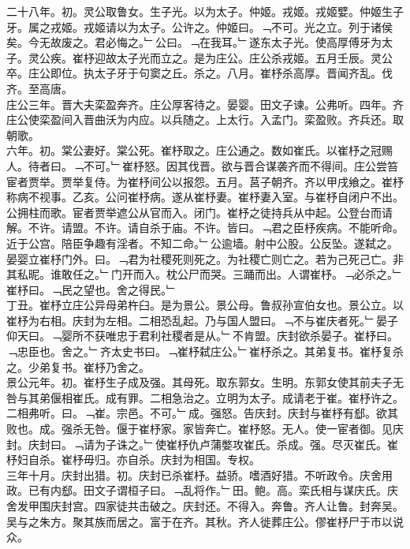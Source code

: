 \documentclass{zhvt-classic}
\begin{document}
\hspace*{2em}二十八年。初。灵公取鲁女。生子光。以为太子。仲姬。戎姬。戎姬嬖。仲姬生子牙。属之戎姬。戎姬请以为太子。公许之。仲姬曰。﹁不可。光之立。列于诸侯矣。今无故废之。君必悔之。﹂公曰。﹁在我耳。﹂遂东太子光。使高厚傅牙为太子。灵公疾。崔杼迎故太子光而立之。是为庄公。庄公杀戎姬。五月壬辰。灵公卒。庄公即位。执太子牙于句窦之丘。杀之。八月。崔杼杀高厚。晋闻齐乱。伐齐。至高唐。\\
\hspace*{2em}庄公三年。晋大夫栾盈奔齐。庄公厚客待之。晏婴。田文子谏。公弗听。四年。齐庄公使栾盈间入晋曲沃为内应。以兵随之。上太行。入孟门。栾盈败。齐兵还。取朝歌。\\
\hspace*{2em}六年。初。棠公妻好。棠公死。崔杼取之。庄公通之。数如崔氏。以崔杼之冠赐人。待者曰。﹁不可。﹂崔杼怒。因其伐晋。欲与晋合谋袭齐而不得间。庄公尝笞宦者贾举。贾举复侍。为崔杼间公以报怨。五月。莒子朝齐。齐以甲戌飨之。崔杼称病不视事。乙亥。公问崔杼病。遂从崔杼妻。崔杼妻入室。与崔杼自闭户不出。公拥柱而歌。宦者贾举遮公从官而入。闭门。崔杼之徒持兵从中起。公登台而请解。不许。请盟。不许。请自杀于庙。不许。皆曰。﹁君之臣杼疾病。不能听命。近于公宫。陪臣争趣有淫者。不知二命。﹂公逾墙。射中公股。公反坠。遂弑之。晏婴立崔杼门外。曰。﹁君为社稷死则死之。为社稷亡则亡之。若为己死己亡。非其私昵。谁敢任之。﹂门开而入。枕公尸而哭。三踊而出。人谓崔杼。﹁必杀之。﹂崔杼曰。﹁民之望也。舍之得民。﹂\\
\hspace*{2em}丁丑。崔杼立庄公异母弟杵臼。是为景公。景公母。鲁叔孙宣伯女也。景公立。以崔杼为右相。庆封为左相。二相恐乱起。乃与国人盟曰。﹁不与崔庆者死。﹂晏子仰天曰。﹁婴所不获唯忠于君利社稷者是从。﹂不肯盟。庆封欲杀晏子。崔杼曰。﹁忠臣也。舍之。﹂齐太史书曰。﹁崔杼弑庄公。﹂崔杼杀之。其弟复书。崔杼复杀之。少弟复书。崔杼乃舍之。\\
\hspace*{2em}景公元年。初。崔杼生子成及强。其母死。取东郭女。生明。东郭女使其前夫子无咎与其弟偃相崔氏。成有罪。二相急治之。立明为太子。成请老于崔。崔杼许之。二相弗听。曰。﹁崔。宗邑。不可。﹂成。强怒。告庆封。庆封与崔杼有郄。欲其败也。成。强杀无咎。偃于崔杼家。家皆奔亡。崔杼怒。无人。使一宦者御。见庆封。庆封曰。﹁请为子诛之。﹂使崔杼仇卢蒲嫳攻崔氏。杀成。强。尽灭崔氏。崔杼妇自杀。崔杼毋归。亦自杀。庆封为相国。专权。\\
\hspace*{2em}三年十月。庆封出猎。初。庆封已杀崔杼。益骄。嗜酒好猎。不听政令。庆舍用政。已有内郄。田文子谓桓子曰。﹁乱将作。﹂田。鲍。高。栾氏相与谋庆氏。庆舍发甲围庆封宫。四家徒共击破之。庆封还。不得入。奔鲁。齐人让鲁。封奔吴。吴与之朱方。聚其族而居之。富于在齐。其秋。齐人徙葬庄公。僇崔杼尸于市以说众。\\
\end{document}
